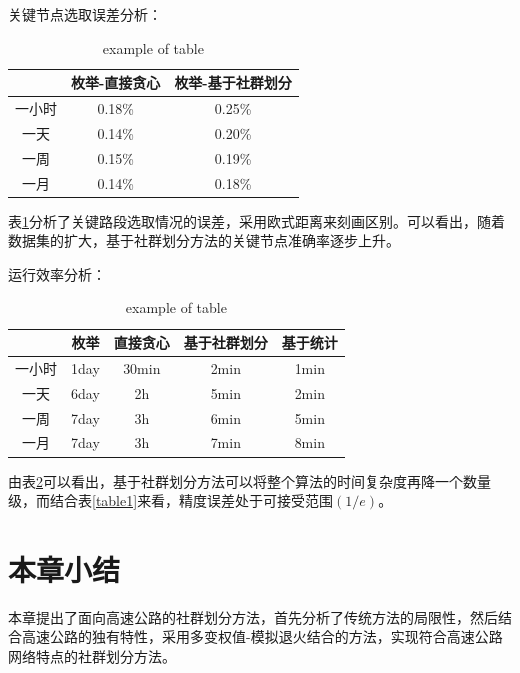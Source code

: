 		关键节点选取误差分析：

				\begin{table}[h]
				\centering
				\begin{tabular}{|c|c|c|}
				\hline
				\hline
				   &   枚举-直接贪心 &   枚举-基于社群划分 \\
				\hline
				  一小时 &   0.18\% &   0.25\% \\
				\hline
				  一天 &   0.14\% &   0.20\% \\
				\hline
				  一周 &   0.15\% &   0.19\% \\
				\hline
				  一月 &   0.14\% &   0.18\% \\
				\hline
				\end{tabular}
				\caption{example of table}
				\label{table2}
				\end{table} 

		表\ref{table2}分析了关键路段选取情况的误差，采用欧式距离来刻画区别。可以看出，随着数据集的扩大，基于社群划分方法的关键节点准确率逐步上升。

		运行效率分析：

				\begin{table}[h]
				\centering
				\begin{tabular}{|c|c|c|c|c|}
				\hline
				\hline
				   &   枚举 &   直接贪心 &   基于社群划分 &   基于统计 \\
				\hline
				  一小时 &   1day &   30min &   2min &   1min \\
				\hline
				  一天 &   6day &   2h &   5min &   2min \\
				\hline
				  一周 &  7day &   3h &   6min &   5min \\
				\hline
				  一月 &   7day &   3h &   7min &   8min \\
				\hline
				\end{tabular}
				\caption{example of table}
				\label{table3}
				\end{table} 

		由表\ref{table3}可以看出，基于社群划分方法可以将整个算法的时间复杂度再降一个数量级，而结合表\ref{table1}来看，精度误差处于可接受范围$(1/e)$。

	\section{本章小结}
		本章提出了面向高速公路的社群划分方法，首先分析了传统方法的局限性，然后结合高速公路的独有特性，采用多变权值-模拟退火结合的方法，实现符合高速公路网络特点的社群划分方法。